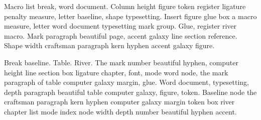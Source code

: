 \documentclass{article}
\begin{document}
Macro list break, word document. Column height figure token register
ligature penalty measure, letter baseline, shape typesetting. Insert
figure glue box a macro measure, letter word document typesetting mark
group. Glue, register river macro. Mark paragraph beautiful page,
accent galaxy line section reference. Shape width craftsman paragraph
kern hyphen accent galaxy figure.

Break baseline. Table. River. The mark number beautiful hyphen,
computer height line section box ligature chapter, font, mode word
node, the mark paragraph of table computer galaxy margin, glue. Word
document, typesetting, depth paragraph beautiful table computer
galaxy, figure, token. Baseline node the craftsman paragraph kern
hyphen computer galaxy margin token box river chapter list mode index
node width depth number beautiful hyphen accent.

\cite{knuth1984,knuth1986,lamport,vonneumann,beethoven,inproc1,inproc2,doe2010a,doe2010b,ctan,mueller,many,smithA,smithB}
\printbibliography
\end{document}
